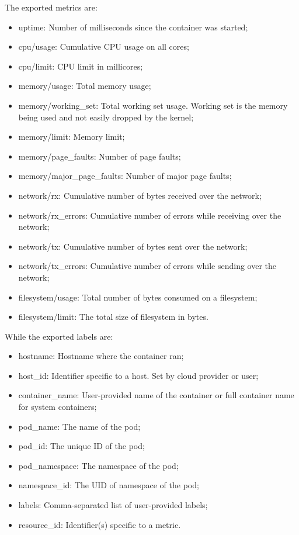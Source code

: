 The exported metrics are:
\begin{itemize}

\item
  uptime: Number of milliseconds since the container was started;
\item
  cpu/usage: Cumulative CPU usage on all cores;
\item
  cpu/limit: CPU limit in millicores;
\item
  memory/usage: Total memory usage;
\item
  memory/working\_set: Total working set usage. Working set is the
  memory being used and not easily dropped by the kernel;
\item
  memory/limit: Memory limit;
\item
  memory/page\_faults: Number of page faults;
\item
  memory/major\_page\_faults: Number of major page faults;
\item
  network/rx: Cumulative number of bytes received over the network;
\item
  network/rx\_errors: Cumulative number of errors while receiving over
  the network;
\item
  network/tx: Cumulative number of bytes sent over the network;
\item
  network/tx\_errors: Cumulative number of errors while sending over the
  network;
\item
  filesystem/usage: Total number of bytes consumed on a filesystem;
\item
  filesystem/limit: The total size of filesystem in bytes.
\end{itemize}

While the exported labels are:

\begin{itemize}
\item
  hostname: Hostname where the container ran;
\item
  host\_id: Identifier specific to a host. Set by cloud provider or user;
\item
  container\_name: User-provided name of the container or full container
  name for system containers;
\item
  pod\_name: The name of the pod;
\item
  pod\_id: The unique ID of the pod;
\item
  pod\_namespace: The namespace of the pod;
\item
  namespace\_id: The UID of namespace of the pod;
\item
  labels: Comma-separated list of user-provided labels;
\item
  resource\_id: Identifier(s) specific to a metric.
\end{itemize}

